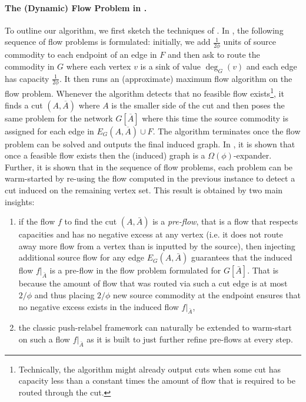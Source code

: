 \documentclass[11pt]{article}
\newcommand\ff{\boldsymbol{\mathit{f}}}
\begin{document}
\paragraph{The (Dynamic) Flow Problem in \cite{saranurak2019expander}.} To outline our algorithm, we first sketch the techniques of \cite{saranurak2019expander}. In \cite{saranurak2019expander}, the following sequence of flow problems is formulated: initially, we add $\frac{1}{2\phi}$ units of source commodity to each endpoint of an edge in $F$ and then ask to route the commodity in $G$ where each vertex $v$ is a sink of value $\deg_G(v)$ and each edge has capacity $\frac{1}{2\phi}$. It then runs an (approximate) maximum flow algorithm on the flow problem. Whenever the algorithm detects that no feasible flow exists\footnote{Technically, the algorithm might already output cuts when some cut has capacity less than a constant times the amount of flow that is required to be routed through the cut.}, it finds a cut $(A, \overline{A})$ where $A$ is the smaller side of the cut and then poses the same problem for the network $G[\overline{A}]$ where this time the source commodity is assigned for each edge in $E_G(A, \overline{A}) \cup F$. The algorithm terminates once the flow problem can be solved and outputs the final induced graph. In \cite{saranurak2019expander}, it is shown that once a feasible flow exists then the (induced) graph is a $\Omega(\phi)$-expander. Further, it is shown that in the sequence of flow problems, each problem can be warm-started by re-using the flow computed in the previous instance to detect a cut induced on the remaining vertex set. This result is obtained by two main insights: 
\begin{enumerate}
    \item if the flow $\ff$ to find the cut $(A, \bar{A})$ is a \emph{pre-flow}, that is a flow that respects capacities and has no negative excess at any vertex (i.e. it does not route away more flow from a vertex than is inputted by the source), then injecting additional source flow for any edge $E_G(A, \bar{A})$ guarantees that the induced flow $\ff|_{\bar{A}}$ is a pre-flow in the flow problem formulated for $G[\bar{A}]$. That is because the amount of flow that was routed via such a cut edge is at most $2/\phi$ and thus placing $2/\phi$ new source commodity at the endpoint ensures that no negative excess exists in the induced flow $\ff|_{\bar{A}}$,
    \item the classic push-relabel framework can naturally be extended to warm-start on such a flow $\ff|_{\bar{A}}$ as it is built to just further refine pre-flows at every step.
\end{enumerate}
\end{document}
